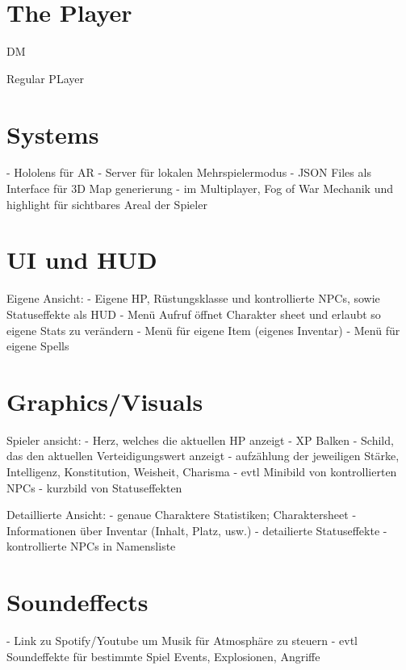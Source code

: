 \documentclass[11pt]{article}
\begin{document}
    \section{The Player}
    DM


    Regular PLayer


    \section{Systems}
    - Hololens für AR
    - Server für lokalen Mehrspielermodus
    - JSON Files als Interface für 3D Map generierung
    - im Multiplayer, Fog of War Mechanik und highlight für sichtbares Areal der Spieler

    \section{UI und HUD}
    Eigene Ansicht:
    - Eigene HP, Rüstungsklasse und kontrollierte NPCs, sowie Statuseffekte als HUD
    - Menü Aufruf öffnet Charakter sheet und erlaubt so eigene Stats zu verändern
    - Menü für eigene Item (eigenes Inventar)
    - Menü für eigene Spells

    \section{Graphics/Visuals}
    Spieler ansicht:
    - Herz, welches die aktuellen HP anzeigt
    - XP Balken
    - Schild, das den aktuellen Verteidigungswert anzeigt
    - aufzählung der jeweiligen Stärke, Intelligenz, Konstitution, Weisheit, Charisma
    - evtl Minibild von kontrollierten NPCs
    - kurzbild von Statuseffekten

    Detaillierte Ansicht:
    - genaue Charaktere Statistiken; Charaktersheet
    - Informationen über Inventar (Inhalt, Platz, usw.)
    - detailierte Statuseffekte
    - kontrollierte NPCs in Namensliste

    \section{Soundeffects}
    - Link zu Spotify/Youtube um Musik für Atmosphäre zu steuern
    - evtl Soundeffekte für bestimmte Spiel Events, Explosionen, Angriffe
\end{document}
